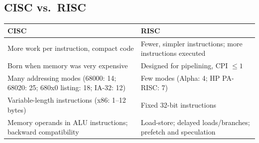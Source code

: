 \documentclass[11pt]{article}
\begin{document}
\subsection{CISC vs.\ RISC}
\begin{center}
\small
\begin{tabular}{@{}p{6.9cm}p{6.9cm}@{}}
\toprule
CISC & RISC \\
\midrule
More work per instruction, compact code & Fewer, simpler instructions; more instructions executed \\
Born when memory was very expensive & Designed for pipelining, CPI $\le1$ \\
Many addressing modes (68000: 14; 68020: 25; 680x0 listing: 18; IA-32: 12) & Few modes (Alpha: 4; HP PA-RISC: 7) \\
Variable-length instructions (x86: 1--12 bytes) & Fixed 32-bit instructions \\
Memory operands in ALU instructions; backward compatibility & Load-store; delayed loads/branches; prefetch and speculation \\
\bottomrule
\end{tabular}
\end{center}
\end{document}
